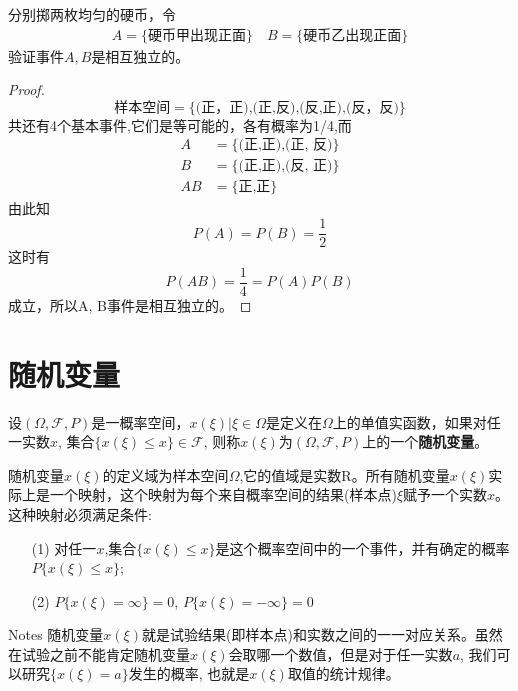 \begin{frame}[shrink]
		分别掷两枚均匀的硬币，令
		\begin{align*}
		A=\{\text{硬币甲出现正面} \}\quad	B=\{\text{硬币乙出现正面} \}
		\end{align*}
		验证事件$A,B$是相互独立的。
 \begin{proof}
			$$\text{样本空间}=\{\text{(正，正),(正,反),(反,正),(反，反)}\} $$
			共还有4个基本事件,它们是等可能的，各有概率为1/4,而\\
			\begin{align*}
			A&=\{\text{(正,正),(正, 反)}\} \\
			B&=\{\text{(正,正),(反, 正)}\} \\
			AB&=\{\text{正,正}\}
			\end{align*}
			由此知 \[P(A)=P(B)=\frac{1}{2}\]
			这时有 \[P(AB)=\frac{1}{4}=P(A)P(B)\]
			成立，所以A, B事件是相互独立的。
 \end{proof}
\end{frame}

\section{随机变量}

\begin{frame}
\begin{definition}
	设$(\Omega,\mathcal{F},P)$是一概率空间，$x(\xi)|\xi\in\Omega$是定义在$\Omega$上的单值实函数，如果对任一实数$x$, 集合$\{x(\xi)\le x\}\in\mathcal{F}$, 则称$x(\xi)$为$(\Omega,\mathcal{F},P)$上的一个\textbf{随机变量}。
	
	随机变量$x(\xi)$的定义域为样本空间$\Omega$,它的值域是实数R。所有随机变量$x(\xi)$实际上是一个映射，这个映射为每个来自概率空间的结果(样本点)$\xi$赋予一个实数$x$。这种映射必须满足条件:
	\begin{itemize}
		\item[(1)] 对任一$x$,集合$\{x(\xi)\le x\}$是这个概率空间中的一个事件，并有确定的概率$P\{x(\xi)\le x\}$;
		\item[(2)] $P\{x(\xi)=\infty \}=0$, $P\{x(\xi)=-\infty \}=0$
	\end{itemize}
	\begin{block}{Notes}
		随机变量$x(\xi)$就是试验结果(即样本点)和实数之间的一一对应关系。虽然在试验之前不能肯定随机变量$x(\xi)$会取哪一个数值，但是对于任一实数$a$, 我们可以研究$\{x(\xi)=a \}$发生的概率, 也就是$x(\xi)$取值的统计规律。
	\end{block}
\end{definition}
\end{frame}

